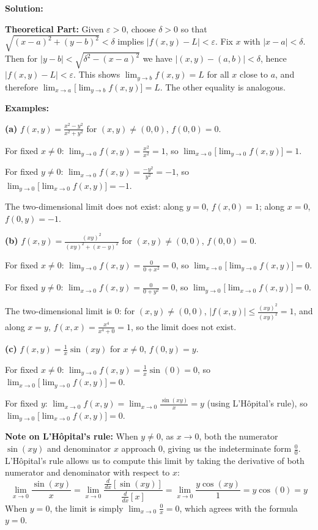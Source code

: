 \bigskip\noindent\textbf{Solution:}

\textbf{Theoretical Part:} Given $\varepsilon>0$, choose $\delta>0$ so that $\sqrt{(x-a)^2+(y-b)^2}<\delta$ implies $|f(x,y)-L|<\varepsilon$. Fix $x$ with $|x-a|<\delta$. Then for $|y-b|<\sqrt{\delta^2-(x-a)^2}$ we have $|(x,y)-(a,b)|<\delta$, hence $|f(x,y)-L|<\varepsilon$. This shows $\lim_{y\to b}f(x,y)=L$ for all $x$ close to $a$, and therefore $\lim_{x\to a}\big[\lim_{y\to b}f(x,y)\big]=L$. The other equality is analogous.

\textbf{Examples:}

\noindent\textbf{(a)} $f(x,y)=\frac{x^2-y^2}{x^2+y^2}$ for $(x,y)\neq(0,0)$, $f(0,0)=0$.

For fixed $x\neq0$: $\lim_{y\to0}f(x,y)=\frac{x^2}{x^2}=1$, so $\lim_{x\to0}\big[\lim_{y\to0}f(x,y)\big]=1$.

For fixed $y\neq0$: $\lim_{x\to0}f(x,y)=\frac{-y^2}{y^2}=-1$, so $\lim_{y\to0}\big[\lim_{x\to0}f(x,y)\big]=-1$.

The two-dimensional limit does not exist: along $y=0$, $f(x,0)=1$; along $x=0$, $f(0,y)=-1$.

\noindent\textbf{(b)} $f(x,y)=\frac{(xy)^2}{(xy)^2+(x-y)^2}$ for $(x,y)\neq(0,0)$, $f(0,0)=0$.

For fixed $x\neq0$: $\lim_{y\to0}f(x,y)=\frac{0}{0+x^2}=0$, so $\lim_{x\to0}\big[\lim_{y\to0}f(x,y)\big]=0$.

For fixed $y\neq0$: $\lim_{x\to0}f(x,y)=\frac{0}{0+y^2}=0$, so $\lim_{y\to0}\big[\lim_{x\to0}f(x,y)\big]=0$.

The two-dimensional limit is $0$: for $(x,y)\neq(0,0)$, $|f(x,y)|\leq\frac{(xy)^2}{(xy)^2}=1$, and along $x=y$, $f(x,x)=\frac{x^4}{x^4+0}=1$, so the limit does not exist.

\bigskip\noindent\textbf{(c)} $f(x,y)=\frac{1}{x}\sin(xy)$ for $x\neq0$, $f(0,y)=y$.

For fixed $x\neq0$: $\lim_{y\to0}f(x,y)=\frac{1}{x}\sin(0)=0$, so $\lim_{x\to0}\big[\lim_{y\to0}f(x,y)\big]=0$.

For fixed $y$: $\lim_{x\to0}f(x,y)=\lim_{x\to0}\frac{\sin(xy)}{x}=y$ (using L'Hôpital's rule), so $\lim_{y\to0}\big[\lim_{x\to0}f(x,y)\big]=0$.

\medskip\noindent\textbf{Note on L'Hôpital's rule:} When $y\neq0$, as $x\to0$, both the numerator $\sin(xy)$ and denominator $x$ approach $0$, giving us the indeterminate form $\frac{0}{0}$. L'Hôpital's rule allows us to compute this limit by taking the derivative of both numerator and denominator with respect to $x$:
\[\lim_{x\to0}\frac{\sin(xy)}{x}=\lim_{x\to0}\frac{\frac{d}{dx}[\sin(xy)]}{\frac{d}{dx}[x]}=\lim_{x\to0}\frac{y\cos(xy)}{1}=y\cos(0)=y\]
When $y=0$, the limit is simply $\lim_{x\to0}\frac{0}{x}=0$, which agrees with the formula $y=0$.

